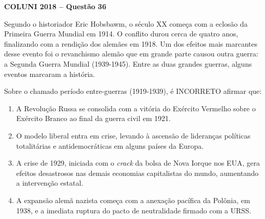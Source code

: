 \textbf{COLUNI 2018 -- Questão 36}\par\medskip Segundo o historiador Eric Hobsbawm, o século XX começa com a eclosão da Primeira Guerra Mundial em 1914. O conflito durou cerca de quatro anos, finalizando com a rendição dos alemães em 1918. Um dos efeitos mais marcantes desse evento foi o revanchismo alemão que em grande parte causou outra guerra: a Segunda Guerra Mundial (1939-1945). Entre as duas grandes guerras, alguns eventos marcaram a história.

\par

Sobre o chamado período entre-guerras (1919-1939), é INCORRETO afirmar que:\begin{enumerate}
\item A Revolução Russa se consolida com a vitória do Exército Vermelho sobre o Exército Branco ao final da guerra
        civil em 1921.
\item O modelo liberal entra em crise, levando à ascensão de lideranças políticas totalitárias e antidemocráticas
        em alguns países da Europa.
\item A crise de 1929, iniciada com o \textit{crack} da bolsa de Nova Iorque nos EUA, gera efeitos desastrosos nas
        demais economias capitalistas do mundo, aumentando a intervenção estatal.
\item A expansão alemã nazista começa com a anexação pacífica da Polônia, em 1938, e a imediata ruptura do
        pacto de neutralidade firmado com a URSS.\end{enumerate}
